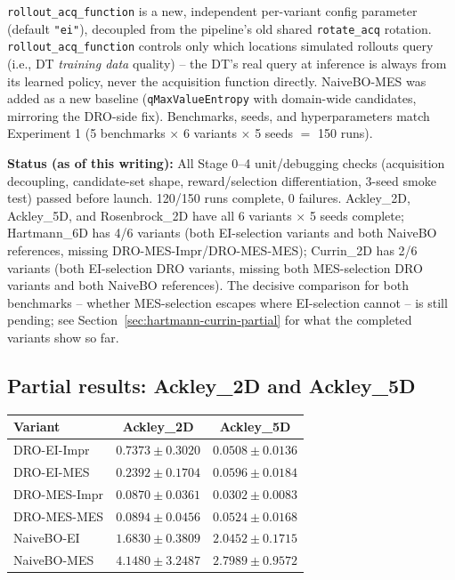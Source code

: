 \documentclass[11pt]{article}
\begin{document}
\texttt{rollout\_acq\_function} is a new, independent per-variant config
parameter (default \texttt{"ei"}), decoupled from the pipeline's old shared
\texttt{rotate\_acq} rotation. \texttt{rollout\_acq\_function} controls only
which locations simulated rollouts query (i.e., DT \emph{training data}
quality) -- the DT's real query at inference is always from its learned
policy, never the acquisition function directly. NaiveBO-MES was added as a new
baseline (\texttt{qMaxValueEntropy} with domain-wide candidates, mirroring the
DRO-side fix). Benchmarks, seeds, and hyperparameters match Experiment 1
(5 benchmarks $\times$ 6 variants $\times$ 5 seeds $=$ 150 runs).

\begin{warnbox}
\textbf{Status (as of this writing):} All Stage 0--4 unit/debugging checks
(acquisition decoupling, candidate-set shape, reward/selection differentiation,
3-seed smoke test) passed before launch. 120/150 runs complete, 0 failures.
Ackley\_2D, Ackley\_5D, and Rosenbrock\_2D have all 6 variants $\times$ 5 seeds
complete; Hartmann\_6D has 4/6 variants (both EI-selection variants and both
NaiveBO references, missing DRO-MES-Impr/DRO-MES-MES); Currin\_2D has 2/6
variants (both EI-selection DRO variants, missing both MES-selection DRO
variants and both NaiveBO references). The decisive comparison for both
benchmarks -- whether MES-selection escapes where EI-selection cannot -- is
still pending; see Section~\ref{sec:hartmann-currin-partial} for what the
completed variants show so far.
\end{warnbox}

\subsection{Partial results: Ackley\_2D and Ackley\_5D}

\begin{center}
\begin{tabular}{lcc}
\toprule
\textbf{Variant} & \textbf{Ackley\_2D} & \textbf{Ackley\_5D} \\
\midrule
DRO-EI-Impr   & $0.7373 \pm 0.3020$ & $0.0508 \pm 0.0136$ \\
DRO-EI-MES    & $0.2392 \pm 0.1704$ & $0.0596 \pm 0.0184$ \\
DRO-MES-Impr  & $\mathbf{0.0870 \pm 0.0361}$ & $\mathbf{0.0302 \pm 0.0083}$ \\
DRO-MES-MES   & $0.0894 \pm 0.0456$ & $0.0524 \pm 0.0168$ \\
NaiveBO-EI    & $1.6830 \pm 0.3809$ & $2.0452 \pm 0.1715$ \\
NaiveBO-MES   & $4.1480 \pm 3.2487$ & $2.7989 \pm 0.9572$ \\
\bottomrule
\end{tabular}
\end{center}
\end{document}

